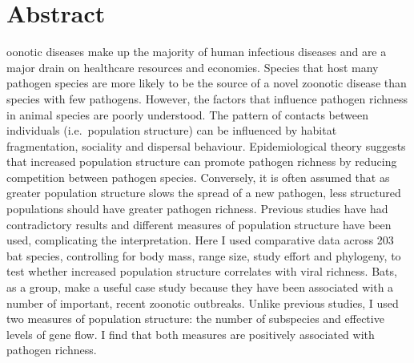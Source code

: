 









\section{Abstract}


oonotic diseases make up the majority of human infectious diseases and are a major drain on healthcare resources and economies.
Species that host many pathogen species are more likely to be the source of a novel zoonotic disease than species with few pathogens.
However, the factors that influence pathogen richness in animal species are poorly understood.
%
%
The pattern of contacts between individuals (i.e.\ population structure) can be influenced by habitat fragmentation, sociality and dispersal behaviour.
Epidemiological theory suggests that increased population structure can promote pathogen richness by reducing competition between pathogen species.
Conversely, it is often assumed that as greater population structure slows the spread of a new pathogen, less structured populations should have greater pathogen richness.
%
%
Previous studies have had contradictory results and different measures of population structure have been used, complicating the interpretation.
%
%
Here I used comparative data across 203 bat species, controlling for body mass, range size, study effort and phylogeny, to test whether increased population structure correlates with viral richness.
Bats, as a group, make a useful case study because they have been associated with a number of important, recent zoonotic outbreaks.
Unlike previous studies, I used two measures of population structure: the number of subspecies and effective levels of gene flow.
I find that both measures are positively associated with pathogen richness.
%
%
